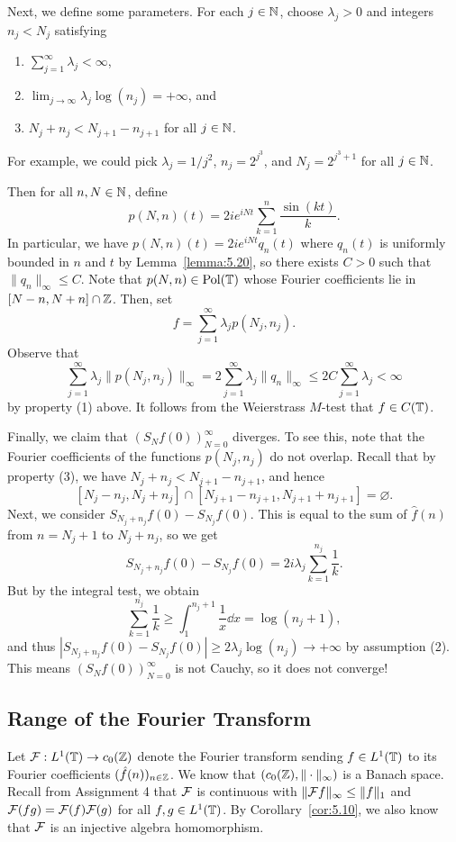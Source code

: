 Next, we define some parameters. For each $j \in \mathbb{N}$, choose 
$\lambda_j > 0$ and integers $n_j < N_j$ satisfying 
\begin{enumerate}[(1)]
    \item $\sum_{j=1}^\infty \lambda_j < \infty$, 
    \item $\lim_{j\to\infty} \lambda_j \log(n_j) = +\infty$, and 
    \item $N_j + n_j < N_{j+1} - n_{j+1}$ for all $j \in \mathbb{N}$. 
\end{enumerate}
For example, we could pick $\lambda_j = 1/j^2$, $n_j = 2^{j^3}$, and 
$N_j = 2^{j^3+1}$ for all $j \in \mathbb{N}$. 

Then for all $n, N \in \mathbb{N}$, define 
\[ p(N, n)(t) = 2ie^{iNt} \sum_{k=1}^n \frac{\sin(kt)}{k}. \] 
In particular, we have $p(N, n)(t) = 2ie^{iNt} q_n(t)$ where $q_n(t)$ is 
uniformly bounded in $n$ and $t$ by Lemma~\ref{lemma:5.20}, so 
there exists $C > 0$ such that $\|q_n\|_\infty \leq C$. Note that 
$p(N, n) \in \operatorname{Pol}(\mathbb{T})$ whose Fourier coefficients lie in 
$[N - n, N + n] \cap \mathbb{Z}$. Then, set 
\[ f = \sum_{j=1}^\infty \lambda_j p(N_j, n_j). \] 
Observe that 
\[ \sum_{j=1}^\infty \lambda_j \|p(N_j, n_j)\|_\infty 
= 2 \sum_{j=1}^\infty \lambda_j \|q_n\|_\infty \leq 
2C \sum_{j=1}^\infty \lambda_j < \infty \] 
by property (1) above. It follows from the Weierstrass $M$-test that 
$f \in C(\mathbb{T})$. 

Finally, we claim that $(S_N f(0))_{N=0}^\infty$ diverges. To see 
this, note that the Fourier coefficients of the functions $p(N_j, n_j)$ 
do not overlap. Recall that by property (3), we have $N_j + n_j < 
N_{j+1} - n_{j+1}$, and hence 
\[ [N_j - n_j, N_j + n_j] \cap [N_{j+1} - n_{j+1}, N_{j+1} + n_{j+1}] = 
\varnothing. \] 
Next, we consider $S_{N_j+n_j} f(0) - S_{N_j} f(0)$. This is equal 
to the sum of $\hat f(n)$ from $n = N_j+1$ to $N_j + n_j$, so we get 
\[ S_{N_j+n_j} f(0) - S_{N_j} f(0) = 2i \lambda_j \sum_{k=1}^{n_j} \frac1k. \] 
But by the integral test, we obtain 
\[ \sum_{k=1}^{n_j} \frac1k \geq \int_1^{n_j+1} \frac1x\dd x = 
\log(n_j+1), \]
and thus $|S_{N_j+n_j} f(0) - S_{N_j} f(0)| \geq 2\lambda_j \log(n_j) 
\to +\infty$ by assumption (2). This means $(S_N f(0))_{N=0}^\infty$ 
is not Cauchy, so it does not converge! 

\subsection{Range of the Fourier Transform} \label{subsec:5.5} 
Let ${\cal F} : L^1(\mathbb{T}) \to c_0(\mathbb{Z})$ denote the Fourier transform 
sending $f \in L^1(\mathbb{T})$ to its Fourier coefficients $(\hat f(n))_{n\in\mathbb{Z}}$. 
We know that $(c_0(\mathbb{Z}), \|\cdot\|_\infty)$ is a Banach space.
Recall from Assignment 4 that ${\cal F}$ is continuous with 
$\|{\cal F}f\|_\infty \leq \|f\|_1$ and ${\cal F}(fg) = 
{\cal F}(f) {\cal F}(g)$ for all $f, g \in L^1(\mathbb{T})$. By Corollary~\ref{cor:5.10},
we also know that ${\cal F}$ is an injective algebra homomorphism.

